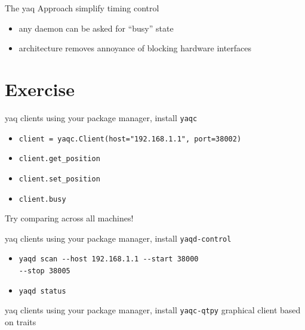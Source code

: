 \documentclass{presentation}
\begin{document}
\begin{frame}{The yaq Approach}
  simplify timing control
  \begin{itemize}
    \item{any daemon can be asked for ``busy'' state}
    \item{architecture removes annoyance of blocking hardware interfaces}
  \end{itemize}
\end{frame}

\section{Exercise}

\begin{frame}{yaq clients}
  using your package manager, install \texttt{yaqc}
  \begin{itemize}
    \item \texttt{client = yaqc.Client(host="192.168.1.1", port=38002)}
    \item \texttt{client.get\_position}
    \item \texttt{client.set\_position}
    \item \texttt{client.busy}
  \end{itemize}
  Try comparing across all machines!
\end{frame}

\begin{frame}{yaq clients}
  using your package manager, install \texttt{yaqd-control}
  \begin{itemize}
    \item \texttt{yaqd scan -{}-host 192.168.1.1 -{}-start 38000 \\ -{}-stop 38005}
    \item \texttt{yaqd status}
  \end{itemize}
\end{frame}

\begin{frame}{yaq clients}
  using your package manager, install \texttt{yaqc-qtpy}
  \vfill
  graphical client based on traits
\end{frame}
\end{document}
